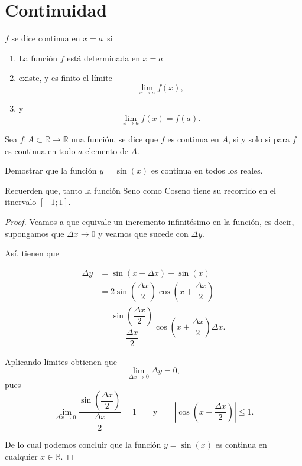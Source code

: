  
\section*{Continuidad}
	
	\begin{definition}
		\(f\) se dice continua en \(x=a\,\) si
		\begin{enumerate}
			\item La funci\'on \(f\) est\'a determinada en \(x=a\)
			\item existe, y es finito el l\'imite 
			\[
			\lim\limits_{x\to a}f(x),
			\]
			
			\item y
			\[
			\lim\limits_{x\to a}f(x)=f(a).
			\]
		\end{enumerate}
	\end{definition}	
	
	Sea \(f:A\subset\mathbb{R}\to\mathbb{R}\) una funci\'on, se dice que \(f\) es continua en \(A\), si y solo si para \(f\) es continua en todo \(a\) elemento de \(A.\)\newline
	
	\begin{exercise}
		Demostrar que la funci\'on \(y=\sin(x)\) es continua en todos los reales.
	\end{exercise}
	
	Recuerden que, tanto la funci\'on Seno como Coseno tiene su recorrido en el itnervalo \([-1;1].\)\newline
	
	\begin{proof}
		Veamos a que equivale un incremento infinit\'esimo en la funci\'on, es decir, supongamos que \(\Delta x\to 0\) y veamos que sucede con \(\Delta y.\)\newline
		
		As\'i, tienen que
		
		\begin{align*}
		\Delta y&=\sin(x+\Delta x)-\sin(x)\\
		&=2\sin\left(\dfrac{\Delta x}{2}\right)\cos\left(x+\dfrac{\Delta x}{2}\right)\\
		&=\dfrac{\sin\left(\dfrac{\Delta x}{2}\right)}{\dfrac{\Delta x}{2}}\cos\left(x+\dfrac{\Delta x}{2}\right)\Delta x.
		\end{align*}
		
		Aplicando l\'imites obtienen que 
		\[
		\lim\limits_{\Delta x\to 0}\Delta y=0,
		\]
		pues 
		\[
		\lim\limits_{\Delta x\to 0}\dfrac{\sin\left(\dfrac{\Delta x}{2}\right)}{\dfrac{\Delta x}{2}}=1\qquad\text{y}\qquad\left|\cos\left(x+\dfrac{\Delta x}{2}\right)\right|\leq 1.
		\]
		
		De lo cual podemos concluir que la funci\'on \(y=\sin(x)\) es continua en cualquier \(x\in\mathbb{R}.\)
	\end{proof}
	
